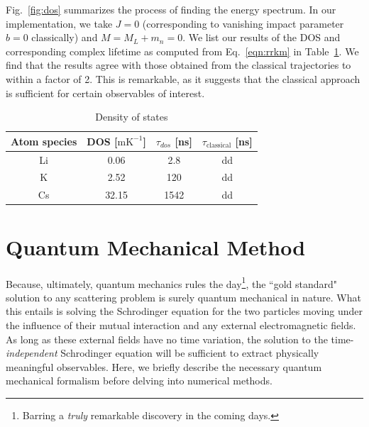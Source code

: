 \documentclass[%
 reprint,
 amsmath,amssymb,
 aps,
 nofootinbib
]{revtex4-1}
\begin{document}
Fig.~\ref{fig:dos} summarizes the process of finding the energy spectrum. In our implementation, we take $J=0$ (corresponding to vanishing impact parameter $b=0$ classically) and $M=M_L+m_n=0$. We list our results of the DOS and corresponding complex lifetime as computed from Eq.~\ref{eqn:rrkm} in Table~\ref{tab:dos}. We find that the results agree with those obtained from the classical trajectories to within a factor of 2. This is remarkable, as it suggests that the classical approach is sufficient for certain observables of interest. 

\begin{table}[b]
\caption{\label{tab:dos}Density of states}
\begin{ruledtabular}
\begin{tabular}{cccc}
 Atom species & DOS [$\text{mK}^{-1}$] & $\tau_{dos}$ [ns] & $\tau_\text{classical}$ [ns]\\ 
\hline
Li & 0.06 & 2.8 & dd \\
K & 2.52 & 120 & dd \\
Cs & 32.15 & 1542 & dd
\end{tabular}
\end{ruledtabular}
\end{table}





\section{\label{sec:QuantumTraj}Quantum Mechanical Method}
Because, ultimately, quantum mechanics rules the day\footnote{Barring a \textit{truly} remarkable discovery in the coming days.}, the ``gold standard" solution to any scattering problem is surely quantum mechanical in nature. What this entails is solving the Schrodinger equation for the two particles moving under the influence of their mutual interaction and any external electromagnetic fields. As long as these external fields have no time variation, the solution to the time-\textit{independent} Schrodinger equation will be sufficient to extract physically meaningful observables. Here, we briefly describe the necessary quantum mechanical formalism before delving into numerical methods.
\end{document}
